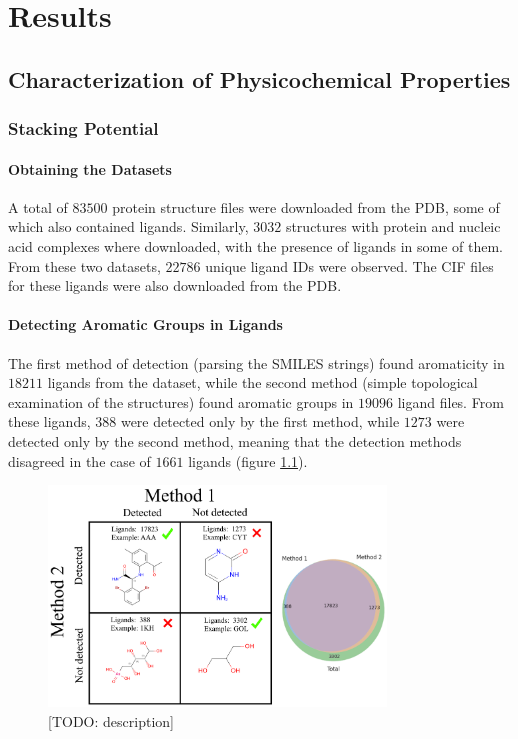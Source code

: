 \chapter{Results} %

\section{Characterization of Physicochemical Properties}
  \subsection{Stacking Potential}
    \subsubsection{Obtaining the Datasets}
      A total of $83500$ protein structure files were downloaded from the PDB, some of which also contained ligands. Similarly, $3032$ structures with protein and nucleic acid complexes where downloaded, with the presence of ligands in some of them. From these two datasets, $22786$ unique ligand IDs were observed. The CIF files for these ligands were also downloaded from the PDB.

    \subsubsection{Detecting Aromatic Groups in Ligands}
      The first method of detection (parsing the SMILES strings) found aromaticity in $18211$ ligands from the dataset, while the second method (simple topological examination of the structures) found aromatic groups in $19096$ ligand files. From these ligands, $388$ were detected only by the first method, while $1273$ were detected only by the second method, meaning that the detection methods disagreed in the case of $1661$ ligands (figure \ref{fig:results/stacking_detection}).

      \begin{figure}[H]
        \centering
        \includegraphics[width=0.8\textwidth]{figures/results/stacking_detection.png}
        \caption{\label{fig:results/stacking_detection} [TODO: description]}
      \end{figure}

